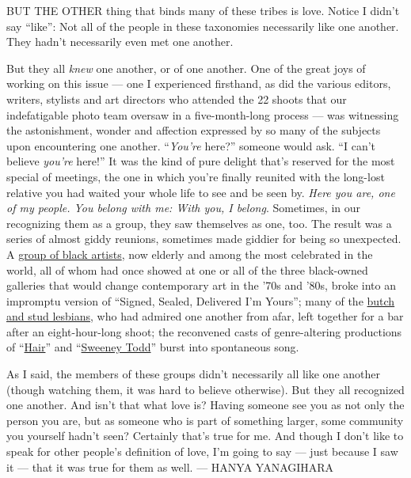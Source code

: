 BUT THE OTHER thing that binds many of these tribes is love. Notice I
didn't say ``like'': Not all of the people in these taxonomies
necessarily like one another. They hadn't necessarily even met one
another.

But they all \emph{knew} one another, or of one another. One of the
great joys of working on this issue --- one I experienced firsthand, as
did the various editors, writers, stylists and art directors who
attended the 22 shoots that our indefatigable photo team oversaw in a
five-month-long process --- was witnessing the astonishment, wonder and
affection expressed by so many of the subjects upon encountering one
another. ``\emph{You're} here?'' someone would ask. ``I can't believe
\emph{you're} here!'' It was the kind of pure delight that's reserved
for the most special of meetings, the one in which you're finally
reunited with the long-lost relative you had waited your whole life to
see and be seen by. \emph{Here you are, one of my people. You belong
with me: With you, I belong}. Sometimes, in our recognizing them as a
group, they saw themselves as one, too. The result was a series of
almost giddy reunions, sometimes made giddier for being so unexpected. A
\href{https://www.nytimes3xbfgragh.onion/interactive/2020/04/13/t-magazine/black-art-galleries.html}{group
of black artists}, now elderly and among the most celebrated in the
world, all of whom had once showed at one or all of the three
black-owned galleries that would change contemporary art in the '70s and
'80s, broke into an impromptu version of ``Signed, Sealed, Delivered I'm
Yours''; many of the
\href{https://www.nytimes3xbfgragh.onion/interactive/2020/04/13/t-magazine/butch-stud-lesbian.html}{butch
and stud lesbians}, who had admired one another from afar, left together
for a bar after an eight-hour-long shoot; the reconvened casts of
genre-altering productions of
``\href{https://www.nytimes3xbfgragh.onion/interactive/2020/04/13/t-magazine/hair-musical-broadway.html}{Hair}''
and
``\href{https://www.nytimes3xbfgragh.onion/interactive/2020/04/13/t-magazine/sweeney-todd-revival.html}{Sweeney
Todd}'' burst into spontaneous song.

As I said, the members of these groups didn't necessarily all like one
another (though watching them, it was hard to believe otherwise). But
they all recognized one another. And isn't that what love is? Having
someone see you as not only the person you are, but as someone who is
part of something larger, some community you yourself hadn't seen?
Certainly that's true for me. And though I don't like to speak for other
people's definition of love, I'm going to say --- just because I saw it
--- that it was true for them as well. --- HANYA YANAGIHARA

